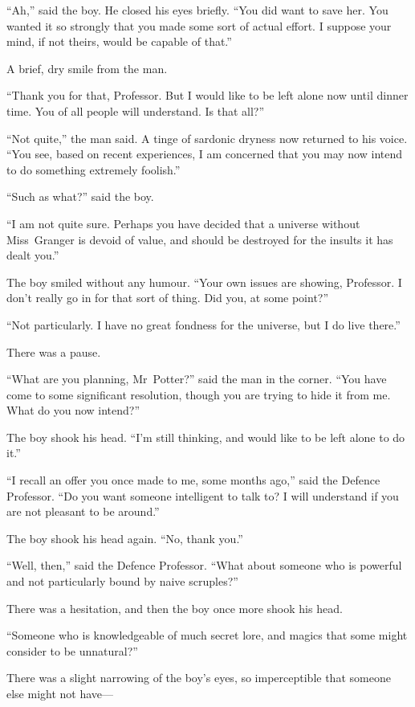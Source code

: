 “Ah,” said the boy. He closed his eyes briefly. “You did want to save her. You wanted it so strongly that you made some sort of actual effort. I suppose your mind, if not theirs, would be capable of that.”

A brief, dry smile from the man.

“Thank you for that, Professor. But I would like to be left alone now until dinner time. You of all people will understand. Is that all?”

“Not quite,” the man said. A tinge of sardonic dryness now returned to his voice. “You see, based on recent experiences, I am concerned that you may now intend to do something extremely foolish.”

“Such as what?” said the boy.

“I am not quite sure. Perhaps you have decided that a universe without Miss~Granger is devoid of value, and should be destroyed for the insults it has dealt you.”

The boy smiled without any humour. “Your own issues are showing, Professor. I don’t really go in for that sort of thing. Did you, at some point?”

“Not particularly. I have no great fondness for the universe, but I do live there.”

There was a pause.

“What are you planning, Mr~Potter?” said the man in the corner. “You have come to some significant resolution, though you are trying to hide it from me. What do you now intend?”

The boy shook his head. “I’m still thinking, and would like to be left alone to do it.”

“I recall an offer you once made to me, some months ago,” said the Defence Professor. “Do you want someone intelligent to talk to? I will understand if you are not pleasant to be around.”

The boy shook his head again. “No, thank you.”

“Well, then,” said the Defence Professor. “What about someone who is powerful and not particularly bound by naive scruples?”

There was a hesitation, and then the boy once more shook his head.

“Someone who is knowledgeable of much secret lore, and magics that some might consider to be unnatural?”

There was a slight narrowing of the boy’s eyes, so imperceptible that someone else might not have—

